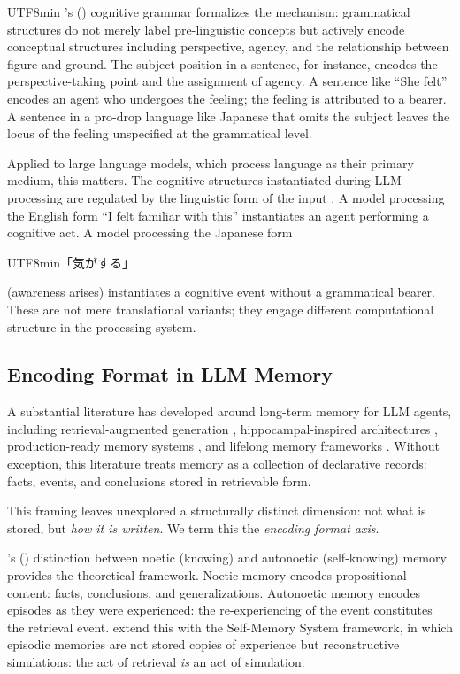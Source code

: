 \documentclass[12pt,a4paper]{article}
\begin{document}
\begin{CJK}{UTF8}{min}
\citeauthor{langacker1987}'s (\citeyear{langacker1987}) cognitive grammar
formalizes the mechanism: grammatical structures do not merely label
pre-linguistic concepts but actively encode conceptual structures including
perspective, agency, and the relationship between figure and ground. The
subject position in a sentence, for instance, encodes the perspective-taking
point and the assignment of agency. A sentence like ``She felt'' encodes an
agent who undergoes the feeling; the feeling is attributed to a bearer. A
sentence in a pro-drop language like Japanese that omits the subject leaves
the locus of the feeling unspecified at the grammatical level.

Applied to large language models, which process language as their primary
medium, this matters. The cognitive structures instantiated during LLM
processing are regulated by the linguistic form of the input
\citep{vonoswald2023}. A model processing the English form ``I felt familiar
with this'' instantiates an agent performing a cognitive act. A model
processing the Japanese form
\begin{CJK}{UTF8}{min}「気がする」\end{CJK}
(awareness arises) instantiates a cognitive event without a grammatical bearer.
These are not mere translational variants; they engage different computational
structure in the processing system.

\subsection{Encoding Format in LLM Memory}

A substantial literature has developed around long-term memory for LLM agents,
including retrieval-augmented generation \citep{lewis2020}, hippocampal-inspired
architectures \citep{gutierrez2025hipporag2}, production-ready memory systems
\citep{chhikara2025mem0}, and lifelong memory frameworks
\citep{zhu2026ariadnemem}. Without exception, this literature treats memory as
a collection of declarative records: facts, events, and conclusions stored in
retrievable form.

This framing leaves unexplored a structurally distinct dimension: not what is
stored, but \emph{how it is written}. We term this the \emph{encoding format
axis}.

\citeauthor{tulving1985}'s (\citeyear{tulving1985,tulving2005}) distinction
between noetic (knowing) and autonoetic (self-knowing) memory provides the
theoretical framework. Noetic memory encodes propositional content: facts,
conclusions, and generalizations. Autonoetic memory encodes episodes as they
were experienced: the re-experiencing of the event constitutes the retrieval
event. \citet{conway2000} extend this with the Self-Memory System framework,
in which episodic memories are not stored copies of experience but
reconstructive simulations: the act of retrieval \emph{is} an act of
simulation.


\end{CJK}
\end{document}
